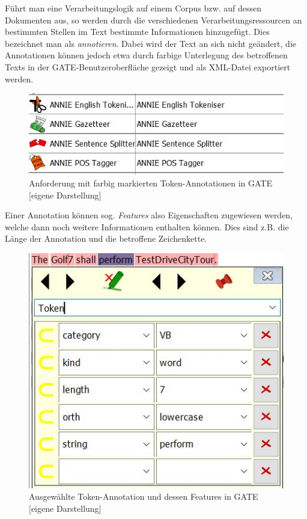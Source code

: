\documentclass[12pt]{report}
\begin{document}
Führt man eine Verarbeitungslogik auf einem Corpus bzw. auf dessen Dokumenten aus, so werden durch die verschiedenen Verarbeitungsressourcen an bestimmten Stellen im Text bestimmte Informationen hinzugefügt. Dies bezeichnet man als \textit{annotieren}. Dabei wird der Text an sich nicht geändert, die Annotationen können jedoch etwa durch farbige Unterlegung des betroffenen Texts in der GATE-Benutzeroberfläche gezeigt und als XML-Datei exportiert werden. 

\begin{figure}[H]
\begin{center}
\includegraphics[scale=0.9]{Bilder/ANNIEinGATE.jpg}
\caption{Anforderung mit farbig markierten Token-Annotationen in GATE [eigene Darstellung]}
\end{center}
\end{figure}   

Einer Annotation können sog. \textit{Features} also Eigenschaften zugewiesen werden, welche dann noch weitere Informationen enthalten können. Dies sind z.B. die Länge der Annotation und die betroffene Zeichenkette.

\begin{figure}[H]
\begin{center}
\includegraphics[scale=0.9]{Bilder/FeaturesInGATE.jpg}
\caption{Ausgewählte Token-Annotation und dessen Features in GATE [eigene Darstellung]}
\end{center}
\end{figure}  
\end{document}
